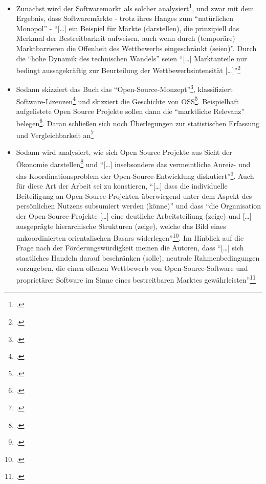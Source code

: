 \documentclass[DIV=calc,BCOR=5mm,11pt,headings=small,oneside,abstract=true, toc=bib]{scrartcl}
\begin{document}
\begin{itemize}
  \item Zunächst wird der Softwaremarkt als solcher
  analysiert\footcite[vgl.][21ff]{Mundhenke2007a}, und zwar mit dem Ergebnis,
  dass Softwaremärkte - trotz ihres Hanges zum \enquote{natürlichen Monopol}
  - \enquote{[\ldots] ein Beispiel für Märkte (darstellen), die prinzipiell
  das Merkmal der Bestreitbarkeit aufweisen, auch wenn durch (temporäre)
  Marktbarrieren die Offenheit des Wettbewerbs eingeschränkt (seien)}.
  Durch die \enquote{hohe Dynamik des technischen Wandels} seien
  \enquote{[\ldots] Marktanteile nur bedingt aussagekräftig zur Beurteilung
  der Wettbewerbsintensität [\ldots]}\footcite[vgl.][3]{Mundhenke2007a}
  \item Sodann skizziert das Buch das
  \enquote{Open-Source-Monzept}\footcite[vgl.][40ff -
  Einzelheiten und Spezifisches]{Mundhenke2007a},  klassifiziert
  Software-Lizenzen\footcite[vgl.][48f -
  Einzelheiten und Spezifisches]{Mundhenke2007a} und skizziert die Geschichte
  von OSS\footcite[vgl.][50ff -
  Einzelheiten und Spezifisches]{Mundhenke2007a}. Beispielhaft aufgelistete Open
  Source Projekte sollen dann die \enquote{marktliche Relevanz}
  belegen\footcite[vgl.][54ff]{Mundhenke2007a}. Daran schließen sich noch
  Überlegungen zur statistischen Erfassung und Vergleichbarkeit
  an\footcite[vgl.][65ff]{Mundhenke2007a}
  \item Sodann wird analysiert, wie sich Open Source Projekte aus Sicht der
  Ökonomie darstellen\footcite[vgl.][69ff]{Mundhenke2007a} und \enquote{[\ldots]
  insebsondere das vermeintliche Anreiz- und das
  Koordinationsproblem der Open-Source-Entwicklung
  diskutiert}\footcite[vgl.][117f]{Mundhenke2007a}. Auch für diese Art
  der Arbeit sei zu konstieren, \enquote{[\ldots] dass die
  individuelle Beiteiligung an Open-Source-Projekten überwiegend unter
  dem Aspekt des persönlichen Nutzens subsumiert werden (könne)} und dass
  \enquote{die Organisation der Open-Source-Projekte [\ldots] eine
  deutliche Arbeitsteiliung (zeige) und [\ldots] ausgeprägte
  hierarchische Strukturen (zeige), welche das Bild eines unkoordinierten
  orientalischen Basars widerlegen}\footcite[vgl.][118]{Mundhenke2007a}.
  Im Hinblick auf die Frage nach der Förderungswürdigkeit meinen die Autoren,
  dass \enquote{[\ldots] sich staatliches Handeln darauf beschränken
  (solle), neutrale Rahmenbedingungen vorzugeben, die einen offenen
  Wettbewerb von Open-Source-Software und proprietärer Software im Sinne
  eines bestreitbaren Marktes
  gewährleisten}\footcite[vgl.][119]{Mundhenke2007a}

\end{itemize}
\end{document}

